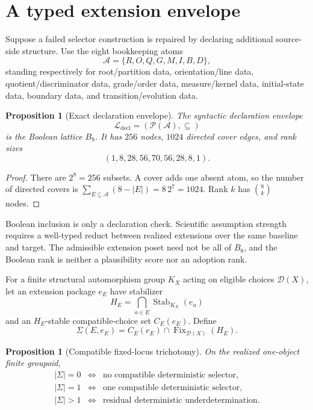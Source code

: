 \documentclass[11pt]{article}
\newtheorem{proposition}[theorem]{Proposition}
\theoremstyle{definition}
\newcommand{\Fix}{\operatorname{Fix}}
\begin{document}
\section{A typed extension envelope}

Suppose a failed selector construction is repaired by declaring additional
source-side structure.  Use the eight bookkeeping atoms
\[
  \mathcal A=\{R,O,Q,G,M,I,B,D\},
\]
standing respectively for root/partition data, orientation/line data,
quotient/discriminator data, grade/order data, measure/kernel data,
initial-state data, boundary data, and transition/evolution data.

\begin{proposition}[Exact declaration envelope]
\label{prop:b8}
The syntactic declaration envelope
\[
  \mathcal L_{\mathrm{decl}}=(\mathcal P(\mathcal A),\subseteq)
\]
is the Boolean lattice \(B_8\).  It has \(256\) nodes, \(1024\) directed
cover edges, and rank sizes
\[
  (1,8,28,56,70,56,28,8,1).
\]
\end{proposition}

\begin{proof}
There are \(2^8=256\) subsets.  A cover adds one absent atom, so the number
of directed covers is
\(\sum_{E\subseteq\mathcal A}(8-|E|)=8\,2^7=1024\).
Rank \(k\) has \(\binom{8}{k}\) nodes.
\end{proof}

Boolean inclusion is only a declaration check.  Scientific assumption
strength requires a well-typed reduct between realized extensions over the
same baseline and target.  The admissible extension poset need not be all of
\(B_8\), and the Boolean rank is neither a plausibility score nor an adoption
rank.

For a finite structural automorphism group \(K_X\) acting on eligible choices
\(\mathcal D(X)\), let an extension package \(e_E\) have stabilizer
\[
  H_E=\bigcap_{a\in E}\operatorname{Stab}_{K_X}(e_a)
\]
and an \(H_E\)-stable compatible-choice set \(C_E(e_E)\).  Define
\[
  \Sigma(E,e_E)=C_E(e_E)\cap\Fix_{\mathcal D(X)}(H_E).
\]

\begin{proposition}[Compatible fixed-locus trichotomy]
On the realized one-object finite groupoid,
\[
\begin{array}{rcl}
|\Sigma|=0 &\Longleftrightarrow& \text{no compatible deterministic selector},\\
|\Sigma|=1 &\Longleftrightarrow& \text{one compatible deterministic selector},\\
|\Sigma|>1 &\Longleftrightarrow& \text{residual deterministic underdetermination}.
\end{array}
\]
\end{proposition}
\end{document}
